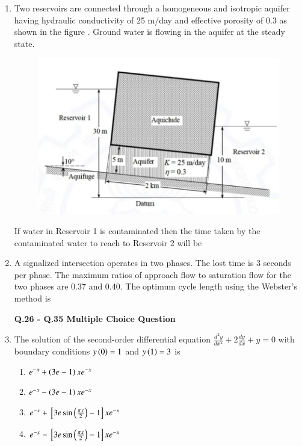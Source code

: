 \documentclass[journal,12pt,onecolumn]{article}
\theoremstyle{remark}
\begin{document}
\begin{enumerate}
\item Two reservoirs are connected through a homogeneous and isotropic aquifer having hydraulic conductivity  of 25 m/day and effective porosity \brak{\eta} of $0.3$ as shown in the figure   . Ground water is flowing in the aquifer at the steady state.
\begin{figure}[H]
    \centering
    \includegraphics[width=0.7\columnwidth]{figs/1q24.jpg}
    \caption{}
    \label{fig:q24}
\end{figure}
If water in Reservoir 1 is contaminated then the time  taken by the contaminated water to reach to Reservoir 2 will be \underline{\hspace{2cm}}
\hfill{}

\item A signalized intersection operates in two phases. The lost time is $3$ seconds per phase. The maximum ratios of approach flow to saturation flow for the two phases are 0.37 and 0.40. The optimum cycle length using the Webster's method  is \underline{\hspace{2cm}}
\hfill{}

\textbf{Q.26 - Q.35 Multiple Choice Question}

\item The solution of the second-order differential equation $\frac{d^2y}{dx^2} + 2\frac{dy}{dx} + y = 0$ with boundary conditions $y\left(0\right)=1$ and $y\left(1\right)=3$ is

\hfill{}
\begin{enumerate}
    \item $e^{-x}+\left(3e-1\right)xe^{-x}$
    \item $e^{-x}-\left(3e-1\right)xe^{-x}$
    \item $e^{-x} + {}\left[3e\sin\left(\frac{\pi x}{2}\right)-1\right]xe^{-x}$
    \item $e^{-x} - {}\left[3e\sin\left(\frac{\pi x}{2}\right)-1\right]xe^{-x}$
\end{enumerate}


\end{enumerate}
\end{document}
